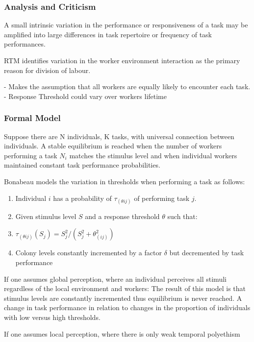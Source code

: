 \subsubsection{Analysis and Criticism}
A small intrinsic variation in the performance or responsiveness of a task may be amplified into large differences in task repertoire or frequency of task performances. 

RTM identifies variation in the worker environment interaction as the primary reason for division of labour.

- Makes the assumption that all workers are equally likely to encounter each task.  
- Response Threshold could vary over workers lifetime

\subsubsection{Formal Model}
Suppose there are N individuals, K tasks, with universal connection between individuals. 
A stable equilibrium is reached when the number of workers performing a task $N_i$ matches the stimulus level and when individual workers maintained constant task performance probabilities. \cite{page1990self}

Bonabeau models the variation in thresholds when performing a task as follows:
\begin{enumerate}
	\item Individual $i$ has a probability of $\tau_(\theta ij)$ of performing task $j$.
	\item Given stimulus level $S$ and a response threshold $\theta$ such that:
	\item $\tau_(\theta ij)(S_j) = S_j^2/(S_j^2 + \theta_(ij)^2)$
	\item Colony levels constantly incremented by a factor $\delta$ but decremented by task performance
\end{enumerate}

If one assumes global perception, where an individual perceives all stimuli regardless of the local environment and workers:
The result of this model is that stimulus levels are constantly incremented thus equilibrium is never reached. A change in task performance in relation to changes in the proportion of individuals with low versus high thresholds. %

If one assumes local perception, where there is only weak temporal polyethism

